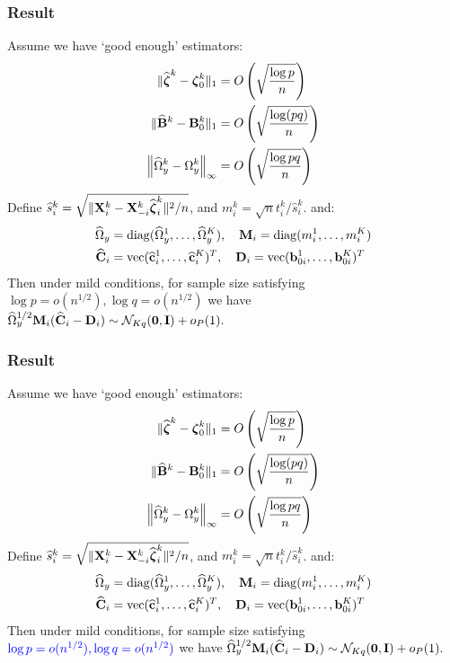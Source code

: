 \documentclass[10pt]{beamer}
\theoremstyle{definition}
\DeclareMathOperator*{\diag}{diag}
\DeclareMathOperator*{\ve}{vec}
\begin{document}
\begin{frame}
\frametitle{Result}
Assume we have `good enough' estimators:
%
\begin{align*}
\| \widehat {{\boldsymbol{\zeta}}}^k - {\boldsymbol{\zeta}}_0^k \|_1 &= O \left( \sqrt { \frac{\log p}{n}} \right)\\
\| \widehat {{\mathbf{B}}}^k - {\mathbf{B}}^k_0 \|_1 &= O \left( \sqrt{\frac{\log (pq)}{n}} \right)\\
\left\| \widehat \Omega_y^k - \Omega_y^k \right\|_\infty &= O \left( \sqrt { \frac{\log p q}{n}} \right)
\end{align*}
%
Define $\widehat s_i^k = \sqrt{\| {\mathbf{X}}_i^k - {\mathbf{X}}_{-i}^k \widehat {{\boldsymbol{\zeta}}}_i^k \|^2/n}$, and $m_i^k = \sqrt n t_i^k / \widehat s_i^k$. and:
%
\begin{align*}
\widehat \Omega_y &= \diag(\widehat \Omega_y^1, \ldots, \widehat \Omega_y^K), \quad
\bfM_i = \diag(m_i^1, \ldots, m_i^K)\\
\widehat \bfC_i &= \ve(\widehat \bfc_i^1, \ldots, \widehat \bfc_i^K)^T, \quad
\bfD_i = \ve(\bfb_{0i}^1, \ldots, \bfb_{0i}^K)^T\\
\end{align*}
%
Then under mild conditions, for sample size satisfying 
$\log p = o(n^{1/2}), \log q = o(n^{1/2})$ we have $\widehat \Omega_y^{1/2} {\mathbf{M}}_i (\widehat {{\mathbf{C}}}_i - {\mathbf{D}}_i) \sim {\cal{N}}_{Kq} ({\bf 0}, {\mathbf{I}}) + o_P(1).$
%
\end{frame}

\begin{frame}
\frametitle{Result}
Assume we have `good enough' estimators:
%
\begin{align*}
\| \widehat {{\boldsymbol{\zeta}}}^k - {\boldsymbol{\zeta}}_0^k \|_1 &= O \left( \sqrt { \frac{\log p}{n}} \right)\\
\| \widehat {{\mathbf{B}}}^k - {\mathbf{B}}^k_0 \|_1 &= O \left( \sqrt{\frac{\log (pq)}{n}} \right)\\
\left\| \widehat \Omega_y^k - \Omega_y^k \right\|_\infty &= O \left( \sqrt { \frac{\log p q}{n}} \right)
\end{align*}
%
Define $\widehat s_i^k = \sqrt{\| {\mathbf{X}}_i^k - {\mathbf{X}}_{-i}^k \widehat {{\boldsymbol{\zeta}}}_i^k \|^2/n}$, and $m_i^k = \sqrt n t_i^k / \widehat s_i^k$. and:
%
\begin{align*}
\widehat \Omega_y &= \diag(\widehat \Omega_y^1, \ldots, \widehat \Omega_y^K), \quad
\bfM_i = \diag(m_i^1, \ldots, m_i^K)\\
\widehat \bfC_i &= \ve(\widehat \bfc_i^1, \ldots, \widehat \bfc_i^K)^T, \quad
\bfD_i = \ve(\bfb_{0i}^1, \ldots, \bfb_{0i}^K)^T\\
\end{align*}
%
Then under mild conditions, for sample size satisfying 
${\color{blue} \log p = o(n^{1/2}), \log q = o(n^{1/2})}$ we have $\widehat \Omega_y^{1/2} {\mathbf{M}}_i (\widehat {{\mathbf{C}}}_i - {\mathbf{D}}_i) \sim {\cal{N}}_{Kq} ({\bf 0}, {\mathbf{I}}) + o_P(1).$
%
\end{frame}
\end{document}
